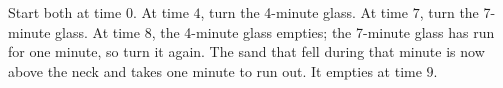 Start both at time $0$. At time $4$, turn the 4-minute glass. At time $7$, turn the 7-minute glass. At time $8$, the 4-minute glass empties; the 7-minute glass has run for one minute, so turn it again. The sand that fell during that minute is now above the neck and takes one minute to run out. It empties at time $\boxed 9$.
